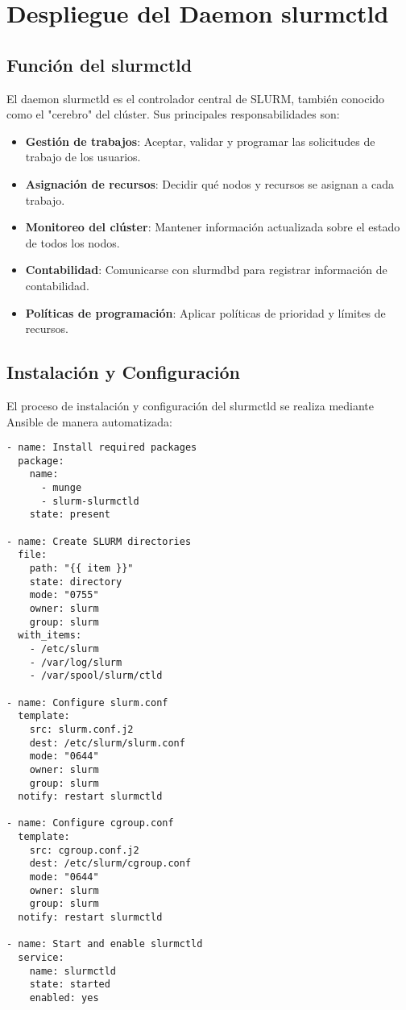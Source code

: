 \documentclass[12pt,a4paper]{article}
\begin{document}
\section{Despliegue del Daemon slurmctld}
\newpage

\subsection{Función del slurmctld}

El daemon slurmctld es el controlador central de SLURM, también conocido como el "cerebro" del clúster. Sus principales responsabilidades son:

\begin{itemize}[leftmargin=*]
    \item \textbf{Gestión de trabajos}: Aceptar, validar y programar las solicitudes de trabajo de los usuarios.
    \item \textbf{Asignación de recursos}: Decidir qué nodos y recursos se asignan a cada trabajo.
    \item \textbf{Monitoreo del clúster}: Mantener información actualizada sobre el estado de todos los nodos.
    \item \textbf{Contabilidad}: Comunicarse con slurmdbd para registrar información de contabilidad.
    \item \textbf{Políticas de programación}: Aplicar políticas de prioridad y límites de recursos.
\end{itemize}

\subsection{Instalación y Configuración}

El proceso de instalación y configuración del slurmctld se realiza mediante Ansible de manera automatizada:

\begin{lstlisting}[language=ansible, caption=Tareas principales para slurmctld]
- name: Install required packages
  package:
    name:
      - munge
      - slurm-slurmctld
    state: present

- name: Create SLURM directories
  file:
    path: "{{ item }}"
    state: directory
    mode: "0755"
    owner: slurm
    group: slurm
  with_items:
    - /etc/slurm
    - /var/log/slurm
    - /var/spool/slurm/ctld

- name: Configure slurm.conf
  template:
    src: slurm.conf.j2
    dest: /etc/slurm/slurm.conf
    mode: "0644"
    owner: slurm
    group: slurm
  notify: restart slurmctld

- name: Configure cgroup.conf
  template:
    src: cgroup.conf.j2
    dest: /etc/slurm/cgroup.conf
    mode: "0644"
    owner: slurm
    group: slurm
  notify: restart slurmctld

- name: Start and enable slurmctld
  service:
    name: slurmctld
    state: started
    enabled: yes
\end{lstlisting}
\end{document}
